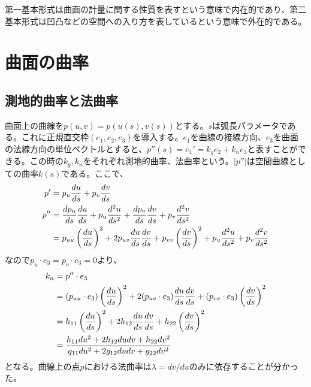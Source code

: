         第一基本形式は曲面の計量に関する性質を表すという意味で内在的であり、第二基本形式は凹凸などの空間への入り方を表しているという意味で外在的である。
        
        
\section{曲面の曲率}
    \subsection{測地的曲率と法曲率}
        曲面上の曲線を$p(u,v)=p(u(s),v(s))$とする。$s$は弧長パラメータである。これに正規直交枠$(e_1,e_2,e_3)$を導入する。$e_1$を曲線の接線方向、$e_3$を曲面の法線方向の単位ベクトルとすると、$p''(s) = e_1' = k_ge_2+k_ne_3$と表すことができる。この時の$k_g,k_n$をそれぞれ測地的曲率、法曲率という。$|p''|$は空間曲線としての曲率$k(s)$である。ここで、
        \begin{align*}
            p' &= p_u\di[u]{s}+p_v\di[v]{s}\\
            p'' &= \di[p_u]{s}\di[u]{s}+p_u\dd[u]{s}
            + \di[p_v]{s}\di[v]{s}+p_v\dd[v]{s}\\
            &= p_{uu}\lr{\di[u]{s}}^2 + 2p_{uv}\di[u]{s}\di[v]{s} + p_{vv}\lr{\di[v]{s}}^2
            + p_u\dd[u]{s} + p_v\dd[v]{s}\\
        \end{align*}
        なので$p_u\cdot e_3=p_v\cdot e_3=0$より、
        \begin{align*}
            k_n &= p''\cdot e_3\\
            &= (p_{uu}\cdot e_3)\lr{\di[u]{s}}^2
            + 2(p_{uv}\cdot e_3)\di[u]{s}\di[v]{s}
            + (p_{vv}\cdot e_3)\lr{\di[v]{s}}^2\\
            &= h_{11}\lr{\di[u]{s}}^2+2h_{12}\di[u]{s}\di[v]{s}+h_{22}\lr{\di[v]{s}}^2\\
            &=\frac{h_{11}du^2+2h_{12}dudv+h_{22}dv^2}
            {g_{11}du^2+2g_{12}dudv+g_{22}dv^2}\\
        \end{align*}
        となる。曲線上の点$p$における法曲率は$\lambda = dv/du$のみに依存することが分かった。

